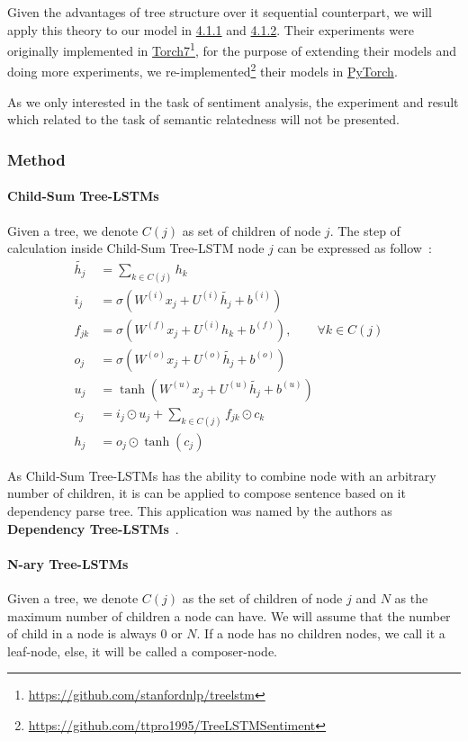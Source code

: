 Given the advantages of tree structure over it sequential counterpart, we will apply this theory to our model in \hyperref[sec:VTtree]{4.1.1} and \hyperref[sec:CNNtree]{4.1.2}. 
Their experiments were originally implemented in \hyperref[sec:torch]{Torch7}\footnote{\url{https://github.com/stanfordnlp/treelstm}}, for the purpose of extending their models and doing more experiments, we re-implemented\footnote{\url{https://github.com/ttpro1995/TreeLSTMSentiment}} their models in \hyperref[sec:pytorch]{PyTorch}. 

As we only interested in the task of sentiment analysis, the experiment and result which related to the task of semantic relatedness will not be presented.

\subsubsection{Method}
\paragraph{Child-Sum Tree-LSTMs}
Given a tree, we denote \(C(j)\) as set of children of node \(j\).
The step of calculation inside Child-Sum Tree-LSTM node \(j\) can be expressed as follow~\cite{treeLSTM}:
\begin{align}
      \tilde{h_j} &= \sum_{k \in C(j)} h_k &\label{eq1:2}\\
      i_j &= \sigma{(W^{(i)}x_j + U^{(i)}\tilde{h_j} + b^{(i)})} &\label{eq1:3}\\
      f_{jk} &= \sigma{(W^{(f)}x_j + U^{(i)}h_k + b^{(f)})}, \qquad  \forall k \in C(j) & \label{eq1:foget1}\\
      o_j &= \sigma{(W^{(o)}x_j + U^{(o)}\tilde{h_j} + b^{(o)})} &\label{eq1:5}\\
      u_j &= \tanh{(W^{(u)}x_j + U^{(u)}\tilde{h_j} + b^{(u)})} &\label{eq1:6}\\
       c_j &= i_j \odot u_j + \sum_{k \in C(j)} f_{jk} \odot c_k & \\
    h_j &= o_j \odot \tanh{(c_j)} &
\end{align}

As Child-Sum Tree-LSTMs has the ability to combine node with an arbitrary number of children, it is can be applied to compose sentence based on it dependency parse tree.
This application was named by the authors as \textbf{Dependency Tree-LSTMs}~\cite{treeLSTM}.

\paragraph{N-ary Tree-LSTMs}
Given a tree, we denote \(C(j)\) as the set of children of node \(j\) and \(N\) as the maximum number of children a node can have. 
We will assume that the number of child in a node is always \(0\) or \(N\). 
If a node has no children nodes, we call it a leaf-node, else, it will be called a composer-node. 

